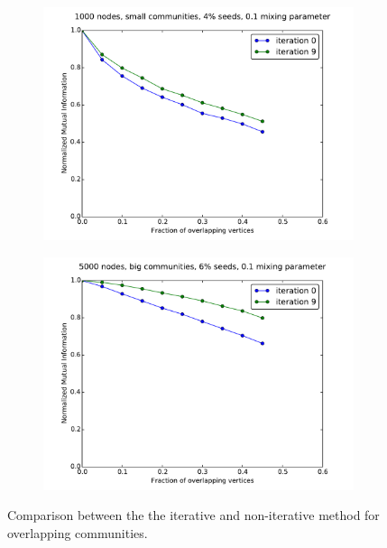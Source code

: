 \begin{figure}
    \centering
    \begin{subfigure}{0.5\textwidth}
    \includegraphics[width=\linewidth]{allplots/overlap_compare_a.pdf}
    \end{subfigure}%
    \begin{subfigure}{0.5\textwidth}
    \includegraphics[width=\linewidth]{allplots/overlap_compare_b.pdf}
    \end{subfigure}
    \caption{Comparison between the the iterative and non-iterative method for overlapping communities.}
\end{figure}


